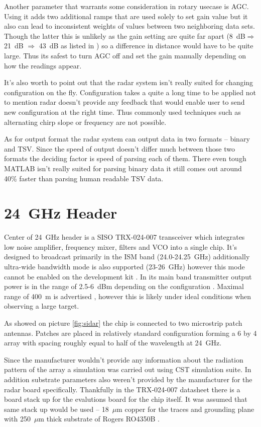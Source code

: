 Another parameter that warrants some consideration in rotary usecase is AGC.
Using it adds two additional ramps that are used solely to set gain value but it also can lead to inconsistent weights of values between two neighboring data sets.
Though the latter this is unlikely as the gain setting are quite far apart (8~dB$\Rightarrow$ 21~dB $\Rightarrow$ 43~dB as listed in \cite{sidarPRO}) so a difference in distance would have to be quite large.
Thus its safest to turn AGC off and set the gain manually depending on how the readings appear.

It's also worth to point out that the radar system isn't really suited for changing configuration on the fly.
Configuration takes a quite a long time to be applied not to mention radar doesn't provide any feedback that would enable user to send new configuration at the right time.
Thus commonly used techniques such as alternating chirp slope or frequency are not possible.

As for output format the radar system can output data in two formats -- binary and TSV.
Since the speed of output doesn't differ much between those two formats the deciding factor is speed of parsing each of them.
There even tough MATLAB isn't really suited for parsing binary data it still comes out around 40\% faster than parsing human readable TSV data.

\section{24~GHz Header}

Center of 24~GHz header is a SISO TRX-024-007 transceiver which integrates low noise amplifier, frequency mixer, filters and VCO into a single chip.
It's designed to broadcast primarily in the ISM band (24.0-24.25~GHz) additionally ultra-wide bandwidth mode is also supported (23-26~GHz) \cite{sidarTRX24} however this mode cannot be enabled on the development kit \cite{sidarPRO}.
In its main band transmitter output power is in the range of 2.5-6~dBm depending on the configuration \cite{sidarTRX24}.
Maximal range of 400~m is advertised \cite{sidarMANOld}, however this is likely under ideal conditions when observing a large target.

As showed on picture \ref{fig:sidar} the chip is connected to two microstrip patch antennas.
Patches are placed in relatively standard configuration forming a 6 by 4 array with spacing roughly equal to half of the wavelength at 24~GHz.

Since the manufacturer wouldn't provide any information about the radiation pattern of the array a simulation was carried out using CST simulation suite.
In addition substrate parameters also weren't provided by the manufacturer for the radar board specifically.
Thankfully in the TRX-024-007 datasheet there is a board stack up for the evalutions board for the chip itself.
It was assumed that same stack up would be used -- 18~$\mu$m copper for the traces and grounding plane with 250~$\mu$m thick substrate of Rogers RO4350B \cite{sidarTRX24}.

